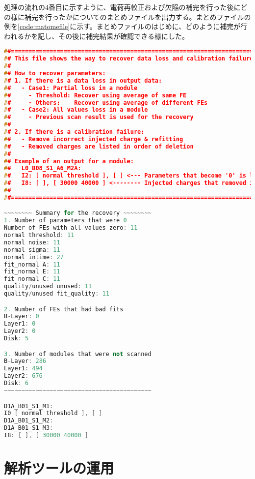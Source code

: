 処理の流れの4番目に示すように、電荷再較正および欠陥の補完を行った後にどの様に補完を行ったかについてのまとめファイルを出力する。まとめファイルの例を\cref{code:matomefile}に示す。まとめファイルのはじめに、どのように補完が行われるかを記し、その後に補完結果が確認できる様にした。

\begin{lstlisting}[caption=解析ツールにより出力される補完結果のまとめ。,label=code:matomefile, language=C++]
##===========================================================================
## This file shows the way to recover data loss and calibration failure.
##
## How to recover parameters:
## 1. If there is a data loss in output data:
##   - Case1: Partial loss in a module
##     - Threshold: Recover using average of same FE
##     - Others:    Recover using average of different FEs
##   - Case2: All values loss in a module
##     - Previous scan result is used for the recovery
##
## 2. If there is a calibration failure:
##   - Remove incorrect injected charge & refitting
##   - Removed charges are listed in order of deletion
##
## Example of an output for a module:
##   L0_B08_S1_A6_M2A:
##   I2: [ normal threshold ], [ ] <--- Parameters that become '0' is listed
##   I8: [ ], [ 30000 40000 ] <-------- Injected charges that removed is listed
##
##===========================================================================

~~~~~~~~ Summary for the recovery ~~~~~~~~
1. Number of parameters that were 0
Number of FEs with all values zero: 11
normal threshold: 11
normal noise: 11
normal sigma: 11
normal intime: 27
fit_normal A: 11
fit_normal E: 11
fit_normal C: 11
quality/unused unused: 11
quality/unused fit_quality: 11

2. Number of FEs that had bad fits
B-Layer: 0
Layer1: 0
Layer2: 0
Disk: 5

3. Number of modules that were not scanned
B-Layer: 286
Layer1: 494
Layer2: 676
Disk: 6
~~~~~~~~~~~~~~~~~~~~~~~~~~~~~~~~~~~~~~~~~~

D1A_B01_S1_M1:
I0 [ normal threshold ], [ ]
D1A_B01_S1_M2:
D1A_B01_S1_M3:
I8: [ ], [ 30000 40000 ]
\end{lstlisting}



\section{解析ツールの運用}
\label{sec:unnyou}

